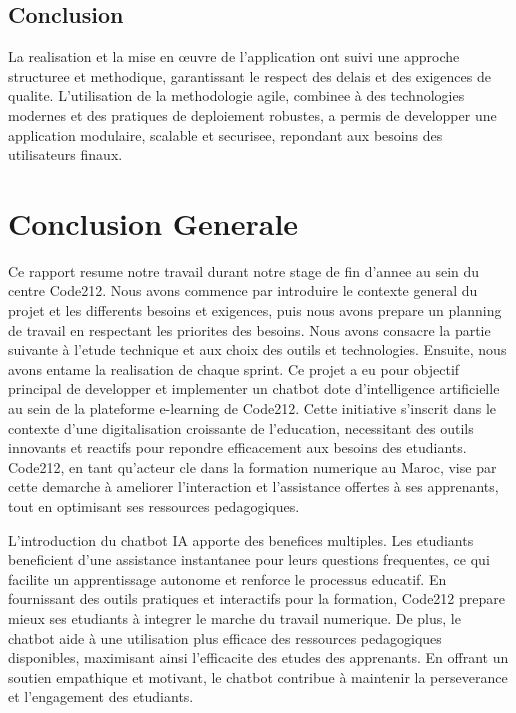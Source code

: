 \documentclass[a4paper, 11pt, openany]{report}
\begin{document}
\section{Conclusion}
La realisation et la mise en œuvre de l'application ont suivi une approche structuree et methodique, garantissant le respect des delais et des exigences de qualite. L'utilisation de la methodologie agile, combinee à des technologies modernes et des pratiques de deploiement robustes, a permis de developper une application modulaire, scalable et securisee, repondant aux besoins des utilisateurs finaux.


\chapter{Conclusion Generale}

Ce rapport resume notre travail durant notre stage de fin d’annee au sein du centre Code212. Nous avons commence par introduire le contexte general du projet et les differents besoins et exigences, puis nous avons prepare un planning de travail en respectant les priorites des besoins. Nous avons consacre la partie suivante à l’etude technique et aux choix des outils et technologies. Ensuite, nous avons entame la realisation de chaque sprint.
\newline
Ce projet a eu pour objectif principal de developper et implementer un chatbot dote d'intelligence artificielle au sein de la plateforme e-learning de Code212. Cette initiative s'inscrit dans le contexte d'une digitalisation croissante de l'education, necessitant des outils innovants et reactifs pour repondre efficacement aux besoins des etudiants. Code212, en tant qu'acteur cle dans la formation numerique au Maroc, vise par cette demarche à ameliorer l'interaction et l'assistance offertes à ses apprenants, tout en optimisant ses ressources pedagogiques.
\newline

L'introduction du chatbot IA apporte des benefices multiples. Les etudiants beneficient d'une assistance instantanee pour leurs questions frequentes, ce qui facilite un apprentissage autonome et renforce le processus educatif. En fournissant des outils pratiques et interactifs pour la formation, Code212 prepare mieux ses etudiants à integrer le marche du travail numerique. De plus, le chatbot aide à une utilisation plus efficace des ressources pedagogiques disponibles, maximisant ainsi l'efficacite des etudes des apprenants. En offrant un soutien empathique et motivant, le chatbot contribue à maintenir la perseverance et l'engagement des etudiants.
\end{document}
